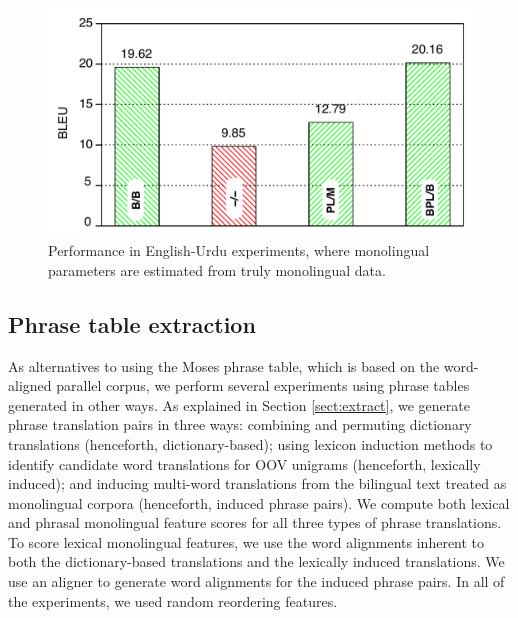\documentclass[11pt]{article}
\begin{document}
\begin{figure}[t]
\includegraphics[width=\linewidth]{../figures/urdu/urdulegendanni.pdf}
\caption{Performance in English-Urdu experiments, where monolingual parameters are estimated from truly  monolingual data.}
\label{fig:urdu}
\end{figure}



\subsection{Phrase table extraction}\label{sect:exp:pt}
As alternatives to using the Moses phrase table, which is based on the word-aligned parallel corpus, we perform several experiments using phrase tables generated in other ways. As explained in Section \ref{sect:extract}, we generate phrase translation pairs in three ways: combining and permuting dictionary translations (henceforth, dictionary-based); using lexicon induction methods to identify candidate word translations for OOV unigrams (henceforth, lexically induced); and inducing multi-word translations from the bilingual text treated as monolingual corpora (henceforth, induced phrase pairs). We compute both lexical and phrasal monolingual feature scores for all three types of phrase translations. To score lexical monolingual features, we use the word alignments inherent to both the dictionary-based translations and the lexically induced translations. We use an aligner \cite{DeNero07} to generate word alignments for the induced phrase pairs. In all of the experiments, we used random reordering features.
\end{document}

